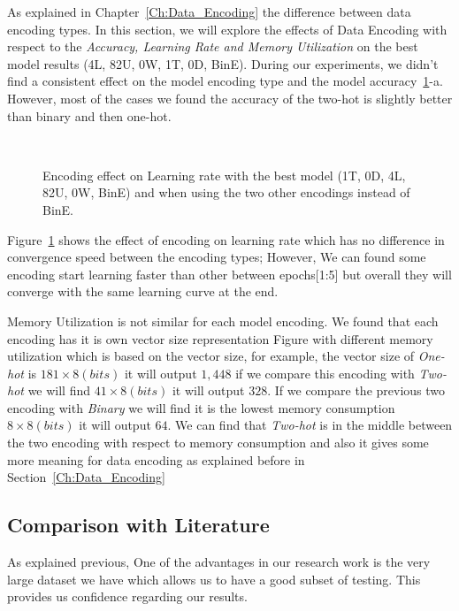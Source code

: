 As explained in Chapter~\ref{Ch:Data_Encoding} the difference between data encoding types. In this section, we will explore the effects of Data Encoding with respect to the \textit{Accuracy, Learning Rate and Memory Utilization} on the best model results (4L, 82U, 0W, 1T, 0D, BinE). During our experiments, we didn't find a consistent effect on the model encoding type and the model accuracy~\ref{Fig:Convergence_Memory}-a. However, most of the cases we found the accuracy of the two-hot is slightly better than binary and then one-hot.


\begin{figure}[!t]
  \centering
  \begin{tikzpicture}
    
  \end{tikzpicture}
  \caption{Encoding effect on Learning rate with the best model (1T, 0D, 4L, 82U, 0W, BinE) and when using the two other encodings instead of BinE.}~\label{Fig:Convergence_Memory}%
\end{figure}


Figure~\ref{Fig:Convergence_Memory} shows the effect of encoding on learning rate which has no difference in convergence speed between the encoding types; However, We can found some encoding start learning faster than other between epochs[1:5] but overall they will converge with the same learning curve at the end.


Memory Utilization is not similar for each model encoding. We found that each encoding has it is own vector size representation Figure with different memory utilization which is based on the vector size, for example, the vector size of \textit{One-hot} is $181 \times 8(bits)$ it will output $1,448$ if we compare this encoding with \textit{Two-hot} we will find $41 \times 8(bits)$ it will output $328$. If we compare the previous two encoding with \textit{Binary} we will find it is the lowest memory consumption $8 \times 8(bits)$ it will output $64$. We can find that \textit{Two-hot} is in the middle between the two encoding with respect to memory consumption and also it gives some more meaning for data encoding as explained before in Section~\ref{Ch:Data_Encoding}

\subsection{Comparison with Literature}
As explained previous, One of the advantages in our research work is the very large dataset we have which allows us to have a good subset of testing. This provides us confidence regarding our results.

